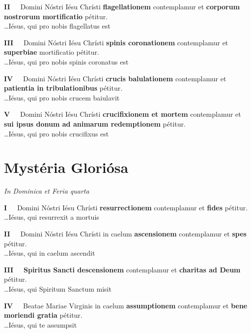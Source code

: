 \documentclass[paper=a5,pagesize=pdftex,fontsize=10pt,headinclude=on,twoside=off]{scrbook}
\newcommand{\mysterium}[1]{\textbf{#1}}
\newcommand{\mysteriumnumero}[1]{\textbf{#1~\textendash~}}
\newcommand{\fructum}[1]{\textbf{#1}}
\newcommand{\dies}[1]{\vspace{-0.6cm}\begin{center}\textit{\tiny#1}\end{center}\vspace{-0.2cm}}
\begin{document}
\mysteriumnumero{II} Domini Nóstri Iésu Chrísti \mysterium{flagellationem} contemplamur et \fructum{corporum nostrorum mortificatio} pétitur.\\
\hspace*{0pt}\hfill \ldots Iésus, qui pro nobis flagellatus est

\mysteriumnumero{III} Domini Nóstri Iésu Chrísti \mysterium{spinis coronationem} contemplamur et \fructum{superbiae} mortificatio pétitur.\\
\hspace*{0pt}\hfill \ldots Iésus, qui pro nobis spinis coronatus est

\mysteriumnumero{IV} Domini Nóstri Iésu Chrísti \mysterium{crucis balulationem} contemplamur et \fructum{patientia in tribulationibus} pétitur.\\
\hspace*{0pt}\hfill \ldots Iésus, qui pro nobis crucem baiulavit

\mysteriumnumero{V} Domini Nóstri Iésu Chrísti \mysterium{crucifixionem et mortem} contemplamur et \fructum{sui ipsus donum ad animarum redemptionem} pétitur.\\
\hspace*{0pt}\hfill \ldots Iésus, qui pro nobis crucifixus est

\newpage 

\section{Mystéria Gloriósa}
\dies{In Dominica et Feria quarta}

\mysteriumnumero{I} Domini Nóstri Iésu Chrísti \mysterium{resurrectionem} contemplamur et \fructum{fides} pétitur.\\
\hspace*{0pt}\hfill \ldots Iésus, qui resurrexit a mortuis

\mysteriumnumero{II} Domini Nóstri Iésu Chrísti in caelum \mysterium{ascensionem} contemplamur et \fructum{spes} pétitur.\\
\hspace*{0pt}\hfill \ldots Iésus, qui in caelum ascendit

\mysteriumnumero{III} \mysterium{Spiritus Sancti descensionem} contemplamur et \fructum{charitas ad Deum} pétitur.\\
\hspace*{0pt}\hfill \ldots Iésus, qui Spiritum Sanctum misit

\mysteriumnumero{IV} Beatae Mariae Virginis in caelum \mysterium{assumptionem} contemplamur et \fructum{bene moriendi gratia} pétitur.\\
\hspace*{0pt}\hfill \ldots Iésus, qui te assumpsit
\end{document}

